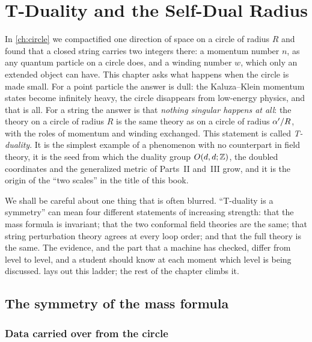 \chapter{T-Duality and the Self-Dual Radius}\label{ch:tduality}

In \cref{ch:circle} we compactified one direction of space on a circle of radius $R$ and found
that a closed string carries two integers there: a momentum number $n$, as any quantum particle
on a circle does, and a winding number $w$, which only an extended object can have. This
chapter asks what happens when the circle is made small. For a point particle the answer is
dull: the Kaluza--Klein momentum states become infinitely heavy, the circle disappears from
low-energy physics, and that is all. For a string the answer is that \emph{nothing singular
happens at all}: the theory on a circle of radius $R$ is the same theory as on a circle of
radius $\alpha'/R$, with the roles of momentum and winding exchanged. This statement is called
\emph{T-duality}. It is the simplest example of a phenomenon with no
counterpart in field theory, it is the seed from which the duality group $O(d,d;\mathbb{Z})$, the
doubled coordinates and the generalized metric of Parts~II and~III grow, and it is the origin
of the ``two scales'' in the title of this book.

We shall be careful about one thing that is often blurred. ``T-duality is a symmetry'' can mean
four different statements of increasing strength: that the mass formula is invariant; that the
two conformal field theories are the same; that string perturbation theory agrees at every
loop order; and that the full theory is the same. The evidence, and the part that a machine
has checked, differ from level to level, and a student should know at each moment which level is
being discussed.  lays out this ladder; the rest of the chapter climbs it.

\section{The symmetry of the mass formula}\label{sec:tduality:mass}

\subsection{Data carried over from the circle}

